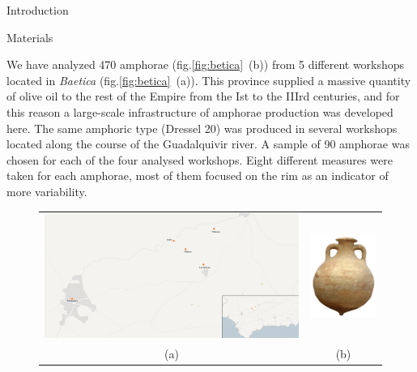 \documentclass[final]{beamer}
\newcommand{\memo}[2]{\textcolor{#1}{#2}}
\newcommand{\xavi}[1]{\memo{orange}{#1\\}}
\newlength{\onecolwid}
\begin{document}
\begin{frame}[t]
\begin{columns}[t]
\begin{column}{\onecolwid}
\begin{block}{Introduction}
\end{block}

\vspace{-0.5cm}

\begin{block}{Materials}

\justify
We have analyzed 470 amphorae (fig.\ref{fig:betica}~(b)) from 5 different workshops located in \emph{Baetica} (fig.\ref{fig:betica}~(a)). This province supplied a massive quantity of olive oil to the rest of the Empire from the Ist to the IIIrd centuries, and for this reason a large-scale infrastructure of amphorae production was developed here. The same amphoric type (Dressel 20) was produced in several workshops located along the course of the Guadalquivir river. A sample of 90 amphorae was chosen for each of the four analysed workshops. Eight different measures were taken for each amphorae, most of them focused on the rim as an indicator of more variability. 



\begin{figure}
\begin{tabular}{cc}


\includegraphics[width=0.7\linewidth]{images/fig1.png} &
\includegraphics[width=0.2\linewidth]{images/amphorae.png} \\
(a) & (b)
\end{tabular}


\end{figure}
\end{block}
\end{column}
\end{columns}
\end{frame}
\end{document}
